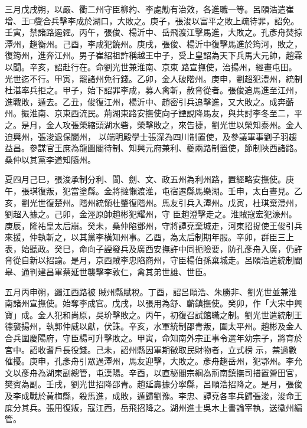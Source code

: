 \begin{pinyinscope}
 三月戊戌朔，以嚴、衢二州守臣柳約、李處勱有治效，各進職一等。呂頤浩遣崔增、王□燮合兵擊李成於湖口，大敗之。庚子，張浚以富平之敗上疏待罪，詔免。壬寅，禁諸路遏糴。丙午，張俊、楊沂中、岳飛渡江擊馬進，大敗之。孔彥舟焚掠潭州，趨衡州。己酉，李成犯饒州。庚戌，張俊、楊沂中復擊馬進於筠河，敗之，復筠州，進奔江州。男子崔紹祖詐稱越王中子，受上皇詔為天下兵馬大元帥，趙霖以聞。辛亥，詔赴行在。命劉光世兼淮南、京東
 路宣撫使，治揚州，經畫屯田。光世迄不行。甲寅，罷諸州免行錢。乙卯，金人破階州。庚申，劉超犯澧州，統制杜湛率兵拒之。甲子，始下詔罪李成，募人禽斬，赦脅從者。張俊追馬進至江州，進戰敗，遁去。乙丑，俊復江州，楊沂中、趙密引兵追擊進，又大敗之。成奔蘄州。振淮南、京東西流民。荊湖東路安撫使向子諲說降馬友，與共討李冬至二，平之。是月，金人攻張榮縮頭湖水砦，榮擊敗之，來告捷，劉光世以榮知泰州。金人迫興州，張浚退保閬州，
 以端明殿學士張深為四川制置使，及參議軍事劉子羽趨益昌。參謀官王庶為龍圖閣待制、知興元府兼利、夔兩路制置使，節制陜西諸路。桑仲以其黨李道知隨州。



 夏四月己巳，張浚承制分利、閬、劍、文、政五州為利州路，置經略安撫使。庚午，張琪復叛，犯當塗縣。金將撻懶渡淮，屯宿遷縣馬樂湖。壬申，太白晝見。乙亥，劉光世復楚州。階州統領杜肇復階州。馬友引兵入潭州。戊寅，杜琪棄澧州，劉超入據之。己卯，金涇原帥趙彬犯耀州，守
 臣趙澄擊走之。淮賊寇宏犯濠州。庚辰，隆祐皇太后崩。癸未，桑仲陷鄧州，守將譚兗棄城走，河東招捉使王俊引兵來援，仲執斬之，以其黨李橫知州事。乙酉，為太后制期年服。辛卯，群臣三上表，始聽政。癸巳，命向子諲發兵及廣西安撫許中同扼險要，防孔彥舟入廣，仍許脅從自新以招諭。是月，京西賊李忠陷商州，守臣楊伯孫棄城走。呂頤浩遣統制閻皋、通判建昌軍蔡延世襲擊李敦仁，禽其弟世雄、世臣。



 五月丙申朔，蠲江西路被
 賊州縣賦稅。丁酉，詔呂頤浩、朱勝非、劉光世並兼淮南諸州宣撫使。始奪李成官。戊戌，以張用為舒、蘄鎮撫使。癸卯，作「大宋中興寶」成。金人犯和尚原，吳玠擊敗之。丙午，初復召試館職之制。劉光世遣統制王德襲揚州，執郭仲威以獻，伏誅。辛亥，水軍統制邵青叛，圍太平州。趙彬及金人合兵圍慶陽府，守臣楊可升擊敗之。甲寅，命知南外宗正事令選年幼宗子，將育於宮中。詔收耆戶長役錢。己未，詔州縣因軍期徵取民財物者，立式榜
 示，禁過數催擾。庚申，孔彥舟引眾過潭州，馬友迎擊，大敗之。彥舟趨岳州，犯鄂州。李允文以彥舟為湖東副總管，屯漢陽。辛酉，以直秘閣宗綱為荊南鎮撫司措置營田官，樊賓為副。壬戌，劉光世招降邵青。趙延壽據分寧縣，呂頤浩招降之。是月，張俊及李成戰於黃梅縣，殺馬進，成敗，遁歸劉豫。李忠、譚兗各率兵歸張浚，浚命王庶分其兵。張用復叛，寇江西，岳飛招降之。湖州進士吳木上書論宰執，送徽州編管。




\end{pinyinscope}
